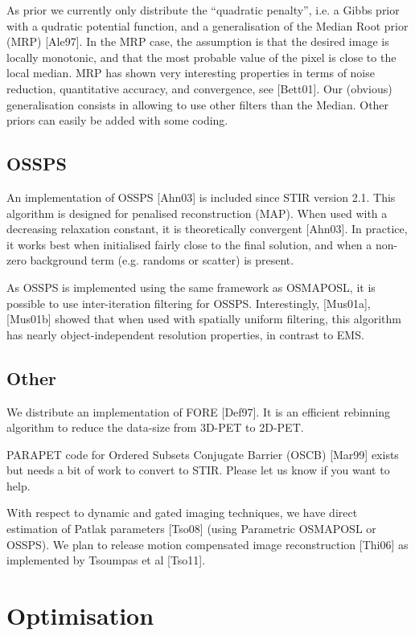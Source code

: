 \documentclass{article}
\begin{document}
As prior we currently only distribute the ``quadratic penalty'', i.e. a
Gibbs prior with a qudratic potential function, and a generalisation of the 
Median Root prior (MRP) [Ale97]. In the MRP case, the assumption 
is that the desired image is locally monotonic, and that the 
most probable value of the pixel is close to the local median. 
MRP has shown very interesting properties in terms of noise reduction, 
quantitative accuracy, and convergence, see [Bett01]. Our (obvious) 
generalisation consists in allowing to use other filters than 
the Median. Other priors can easily be added with some coding. 


\subsection{OSSPS}
An implementation of OSSPS [Ahn03] is included since STIR version 2.1. 
This algorithm is designed for penalised reconstruction (MAP). When used
with a decreasing relaxation constant, it is theoretically convergent [Ahn03].
In practice, it works best when initialised fairly close to the final solution,
and when a non-zero background term (e.g. randoms or scatter) is present.

As OSSPS is implemented using the same framework as OSMAPOSL, it is possible
to use inter-iteration filtering for OSSPS. Interestingly, 
[Mus01a],[Mus01b] showed that when used with spatially uniform filtering,
this algorithm has nearly object-independent
resolution properties, in contrast to EMS.

\subsection{Other}

We distribute an implementation of FORE  [Def97]. It is an efficient 
rebinning algorithm to reduce the data-size from 3D-PET to 2D-PET. 

PARAPET code for 
Ordered Subsets Conjugate Barrier (OSCB) [Mar99] exists but needs
a bit of work to convert to STIR. Please let us know if you 
want to help.
 
With respect to dynamic and gated imaging
techniques, we have direct estimation of Patlak
parameters [Tso08] (using Parametric OSMAPOSL or OSSPS).
We plan to release motion compensated image reconstruction [Thi06] as
implemented by Tsoumpas et al [Tso11].

\section{
Optimisation}
\end{document}
